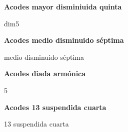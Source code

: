 \vskip 20pt
\textbf{Acodes mayor disminiuida quinta}
\vskip 25pt

\small
{} dim5
\normalsize

\vskip 20pt
\textbf{Acodes medio disminuido s\'eptima}
\vskip 25pt

\small
{} medio disminuido s\'eptima
\normalsize

\vskip 20pt
\textbf{Acodes diada arm\'onica}
\vskip 25pt

\small
{} 5
\normalsize

\vskip 20pt
\textbf{Acodes 13 suspendida cuarta}
\vskip 25pt

\small
{} 13 suspendida cuarta
\normalsize

\clearpage
\fi
%

